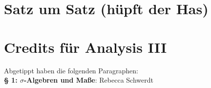 \documentclass[a4paper,twoside,DIV15,BCOR12mm,chapterprefix=true,headings=onelinechapter]{scrbook}
\begin{document}
\appendix
\chapter{Satz um Satz (hüpft der Has)}

\renewcommand{\indexname}{Stichwortverzeichnis}
\printindex

\chapter{Credits für Analysis III} Abgetippt haben die folgenden Paragraphen:\\%
\textbf{§ 1: $\sigma$-Algebren und Maße}: Rebecca Schwerdt\\
\end{document}
